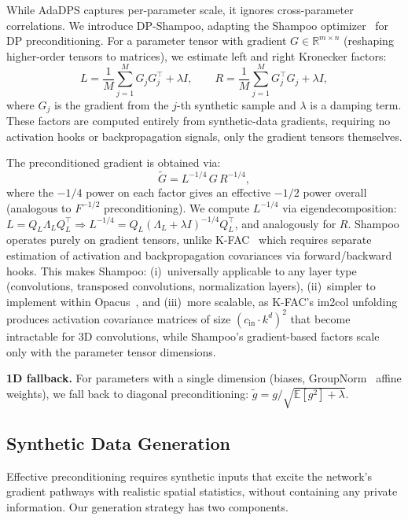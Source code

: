\documentclass[runningheads]{llncs}
\newcommand{\R}{\mathbb{R}}
\newcommand{\E}{\mathbb{E}}
\begin{document}
While AdaDPS captures per-parameter scale, it ignores cross-parameter correlations. We introduce DP-Shampoo, adapting the Shampoo optimizer~\cite{gupta2018shampoo} for DP preconditioning. For a parameter tensor with gradient $G\in\R^{m\times n}$ (reshaping higher-order tensors to matrices), we estimate left and right Kronecker factors:
\begin{equation}
\label{eq:shampoo_factors}
L = \frac{1}{M}\sum_{j=1}^{M} G_j G_j^\top + \lambda I, \qquad
R = \frac{1}{M}\sum_{j=1}^{M} G_j^\top G_j + \lambda I,
\end{equation}
where $G_j$ is the gradient from the $j$-th synthetic sample and $\lambda$ is a damping term. These factors are computed entirely from synthetic-data gradients, requiring no activation hooks or backpropagation signals, only the gradient tensors themselves.

The preconditioned gradient is obtained via:
\begin{equation}
\label{eq:shampoo_precond}
\tilde{G} = L^{-1/4}\, G\, R^{-1/4},
\end{equation}
where the $-1/4$ power on each factor gives an effective $-1/2$ power overall (analogous to $F^{-1/2}$ preconditioning). We compute $L^{-1/4}$ via eigendecomposition: $L = Q_L \Lambda_L Q_L^\top \Rightarrow L^{-1/4} = Q_L(\Lambda_L + \lambda I)^{-1/4}Q_L^\top$, and analogously for $R$. Shampoo operates purely on gradient tensors, unlike K-FAC~\cite{MartensG15} which requires separate estimation of activation and backpropagation covariances via forward/backward hooks. This makes Shampoo: (i)~universally applicable to any layer type (convolutions, transposed convolutions, normalization layers), (ii)~simpler to implement within Opacus~\cite{opacus}, and (iii)~more scalable, as K-FAC's im2col unfolding produces activation covariance matrices of size $(c_\text{in} \cdot k^d)^2$ that become intractable for 3D convolutions, while Shampoo's gradient-based factors scale only with the parameter tensor dimensions.

\textbf{1D fallback.} For parameters with a single dimension (biases, GroupNorm~\cite{wu2018group} affine weights), we fall back to diagonal preconditioning: $\tilde{g}=g/\sqrt{\E[g^2]+\lambda}$.

\subsection{Synthetic Data Generation}
\label{subsec:synthetic}

Effective preconditioning requires synthetic inputs that excite the network's gradient pathways with realistic spatial statistics, without containing any private information. Our generation strategy has two components.
\end{document}
